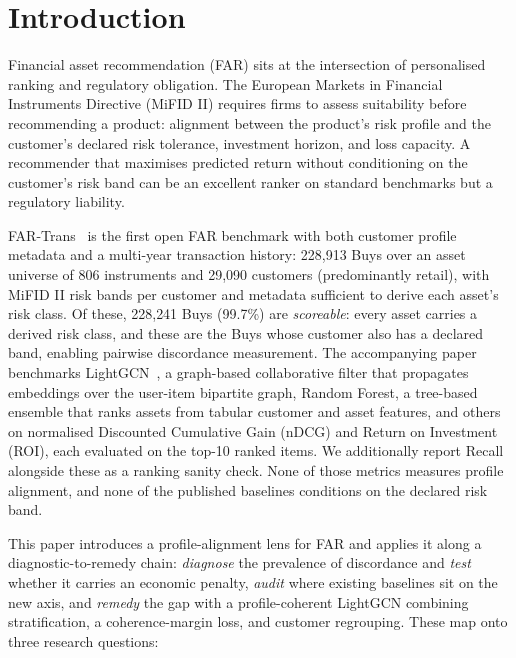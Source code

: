 \section{Introduction}
\label{sec:intro}

Financial asset recommendation (FAR) sits at the intersection of personalised ranking and regulatory obligation. The European Markets in Financial Instruments Directive (MiFID II) requires firms to assess suitability before recommending a product: alignment between the product's risk profile and the customer's declared risk tolerance, investment horizon, and loss capacity. A recommender that maximises predicted return without conditioning on the customer's risk band can be an excellent ranker on standard benchmarks but a regulatory liability.

FAR-Trans~\cite{sanzcruzado2024fartransinvestmentdatasetfinancial} is the first open FAR benchmark with both customer profile metadata and a multi-year transaction history: 228{,}913 Buys over an asset universe of 806 instruments and 29{,}090 customers (predominantly retail), with MiFID II risk bands per customer and metadata sufficient to derive each asset's risk class. Of these, 228{,}241 Buys (99.7\%) are \emph{scoreable}: every asset carries a derived risk class, and these are the Buys whose customer also has a declared band, enabling pairwise discordance measurement. The accompanying paper benchmarks LightGCN~\cite{he2020lightgcnsimplifyingpoweringgraph}, a graph-based collaborative filter that propagates embeddings over the user-item bipartite graph, Random Forest, a tree-based ensemble that ranks assets from tabular customer and asset features, and others on normalised Discounted Cumulative Gain (nDCG) and Return on Investment (ROI), each evaluated on the top-10 ranked items. We additionally report Recall alongside these as a ranking sanity check. None of those metrics measures profile alignment, and none of the published baselines conditions on the declared risk band.

This paper introduces a profile-alignment lens for FAR and applies it along a diagnostic-to-remedy chain: \emph{diagnose} the prevalence of discordance and \emph{test} whether it carries an economic penalty, \emph{audit} where existing baselines sit on the new axis, and \emph{remedy} the gap with a profile-coherent LightGCN combining stratification, a coherence-margin loss, and customer regrouping. These map onto three research questions:

